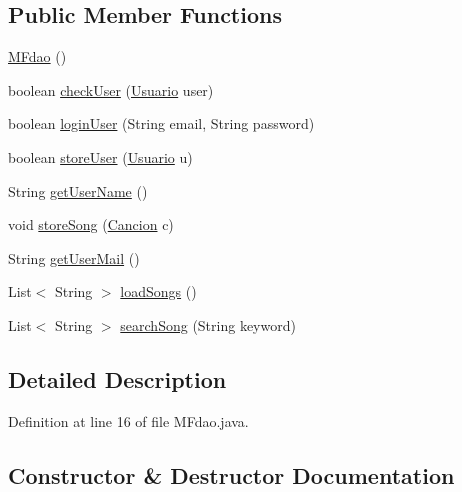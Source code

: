 \subsection*{Public Member Functions}
\begin{DoxyCompactItemize}
\item 
\hyperlink{classes_1_1deusto_1_1spq_1_1server_1_1dao_1_1_m_fdao_a7395178d95595fd7cc7e3387b435ad73}{M\+Fdao} ()
\item 
boolean \hyperlink{classes_1_1deusto_1_1spq_1_1server_1_1dao_1_1_m_fdao_aa63ea4816fac392840181fb557bf485c}{check\+User} (\hyperlink{classes_1_1deusto_1_1spq_1_1server_1_1data_1_1_usuario}{Usuario} user)
\item 
boolean \hyperlink{classes_1_1deusto_1_1spq_1_1server_1_1dao_1_1_m_fdao_a1444b8fec0c62d8edcccdee255b07457}{login\+User} (String email, String password)
\item 
boolean \hyperlink{classes_1_1deusto_1_1spq_1_1server_1_1dao_1_1_m_fdao_a018654ad3063099187b0005145a36ce6}{store\+User} (\hyperlink{classes_1_1deusto_1_1spq_1_1server_1_1data_1_1_usuario}{Usuario} u)
\item 
String \hyperlink{classes_1_1deusto_1_1spq_1_1server_1_1dao_1_1_m_fdao_af351618006ddba9fcf450f5288808020}{get\+User\+Name} ()
\item 
void \hyperlink{classes_1_1deusto_1_1spq_1_1server_1_1dao_1_1_m_fdao_a4e8d7b5135ed5c9ccb65b6cc499c7278}{store\+Song} (\hyperlink{classes_1_1deusto_1_1spq_1_1server_1_1data_1_1_cancion}{Cancion} c)
\item 
String \hyperlink{classes_1_1deusto_1_1spq_1_1server_1_1dao_1_1_m_fdao_a765a8fa4b291fec932c56c0549adea9a}{get\+User\+Mail} ()
\item 
List$<$ String $>$ \hyperlink{classes_1_1deusto_1_1spq_1_1server_1_1dao_1_1_m_fdao_ab5e0871df69651fdb41d03cdc4cfc25b}{load\+Songs} ()
\item 
List$<$ String $>$ \hyperlink{classes_1_1deusto_1_1spq_1_1server_1_1dao_1_1_m_fdao_a69b3efd8be9b8a2add7d57f703a8f4d7}{search\+Song} (String keyword)
\end{DoxyCompactItemize}


\subsection{Detailed Description}


Definition at line 16 of file M\+Fdao.\+java.



\subsection{Constructor \& Destructor Documentation}
